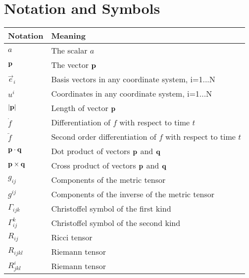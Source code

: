 
\chapter{Notation and Symbols}

{\renewcommand{\tabcolsep}{0.2cm}
\renewcommand{\arraystretch}{1.3}
\begin{tabular}{|l|l|}
\hline
\textbf{Notation} & \textbf{Meaning} \\
\hline

$a$  & The scalar $a$  \\
\hline

$\mathbf{p}$  & The vector $\mathbf{p}$  \\
\hline

$\vec{e}_i$  & Basis vectors in any coordinate system, i=1...N  \\
\hline

$u^i$  & Coordinates in any coordinate system, i=1...N  \\
\hline

$|\mathbf{p}|$  & Length of vector $\mathbf{p}$  \\
\hline

$\dot{f}$ & Differentiation of $f$ with respect to time $t$\\
\hline

$\ddot{f}$ & Second order differentiation of $f$ with respect to time $t$\\
\hline

$\mathbf{p} \cdot \mathbf{q}$  & Dot product of vectors $\mathbf{p}$ and $\mathbf{q}$  \\
\hline

$\mathbf{p}\times \mathbf{q}$  & Cross product of vectors $\mathbf{p}$ and $\mathbf{q}$ \\
\hline

$g_{ij}$  & Components of the metric tensor\\
\hline

$g^{ij}$  & Components of the inverse of the metric tensor\\
\hline

$\Gamma_{ijk}$  & Christoffel symbol of the first kind\\
\hline

$\Gamma^k_{ij}$  & Christoffel symbol of the second kind\\
\hline

$R_{ij}$  & Ricci tensor\\
\hline

$R_{ijkl}$  & Riemann tensor\\
\hline

$R_{jkl}^i$  & Riemann tensor\\
\hline

\end{tabular}
}
